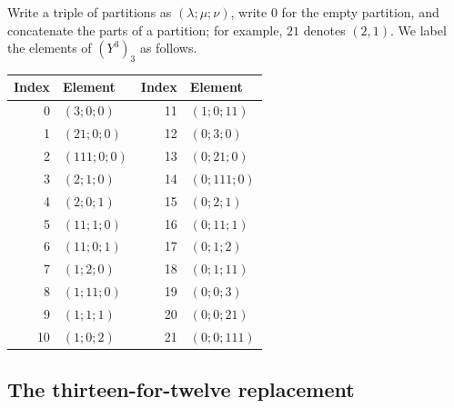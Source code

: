 \documentclass[10pt,a4paper]{amsart}
\begin{document}
Write a triple of partitions as $(\lambda;\mu;\nu)$, write $0$ for the empty partition, and concatenate the parts of a partition; for example, $21$ denotes $(2,1)$. We label the elements of $(Y^3)_3$ as follows.

\begin{center}
\renewcommand{\arraystretch}{1.08}
\begin{tabular}{@{}r l r l@{}}
\toprule
Index & Element & Index & Element\\
\midrule
0  & $(3;0;0)$   & 11 & $(1;0;11)$\\
1  & $(21;0;0)$  & 12 & $(0;3;0)$\\
2  & $(111;0;0)$ & 13 & $(0;21;0)$\\
3  & $(2;1;0)$   & 14 & $(0;111;0)$\\
4  & $(2;0;1)$   & 15 & $(0;2;1)$\\
5  & $(11;1;0)$  & 16 & $(0;11;1)$\\
6  & $(11;0;1)$  & 17 & $(0;1;2)$\\
7  & $(1;2;0)$   & 18 & $(0;1;11)$\\
8  & $(1;11;0)$  & 19 & $(0;0;3)$\\
9  & $(1;1;1)$   & 20 & $(0;0;21)$\\
10 & $(1;0;2)$   & 21 & $(0;0;111)$\\
\bottomrule
\end{tabular}
\end{center}

\subsection{The thirteen-for-twelve replacement}\label{subsec:replacement}
\end{document}
